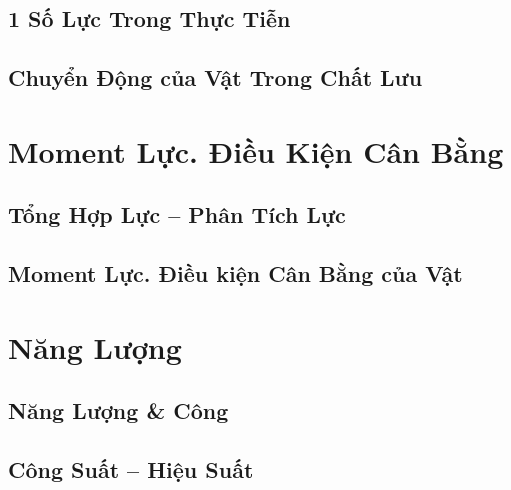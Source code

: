 \documentclass[oneside]{book}
\numberwithin{equation}{section}
\begin{document}

\section{1 Số Lực Trong Thực Tiễn}


\section{Chuyển Động của Vật Trong Chất Lưu}


\chapter{Moment Lực. Điều Kiện Cân Bằng}

\section{Tổng Hợp Lực -- Phân Tích Lực}


\section{Moment Lực. Điều kiện Cân Bằng của Vật}


\chapter{Năng Lượng}

\section{Năng Lượng \& Công}


\section{Công Suất -- Hiệu Suất}
\end{document}

